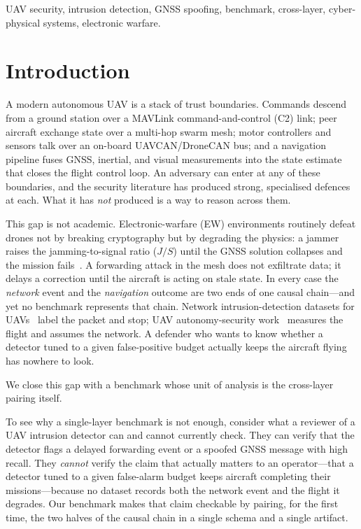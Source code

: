 \documentclass[conference]{IEEEtran}
\begin{document}
\begin{IEEEkeywords}
UAV security, intrusion detection, GNSS spoofing, benchmark, cross-layer,
cyber-physical systems, electronic warfare.
\end{IEEEkeywords}

\section{Introduction}
A modern autonomous UAV is a stack of trust boundaries. Commands descend from a
ground station over a MAVLink command-and-control (C2) link; peer aircraft
exchange state over a multi-hop swarm mesh; motor controllers and sensors talk
over an on-board UAVCAN/DroneCAN bus; and a navigation pipeline fuses GNSS,
inertial, and visual measurements into the state estimate that closes the flight
control loop. An adversary can enter at any of these boundaries, and the
security literature has produced strong, specialised defences at each. What it
has \emph{not} produced is a way to reason across them.

This gap is not academic. Electronic-warfare (EW) environments routinely defeat
drones not by breaking cryptography but by degrading the physics: a jammer
raises the jamming-to-signal ratio ($J/S$) until the GNSS solution collapses and
the mission fails~\cite{kassas2022jammer}. A forwarding attack in the mesh does
not exfiltrate data; it delays a correction until the aircraft is acting on stale
state. In every case the \emph{network} event and the \emph{navigation} outcome
are two ends of one causal chain---and yet no benchmark represents that chain.
Network intrusion-detection datasets for
UAVs~\cite{uavids2025,uavcas2026,hcrl_uavcan} label the packet and stop; UAV
autonomy-security work~\cite{whelan2020novelty,kerns2014capture} measures the
flight and assumes the network. A defender who wants to know whether a detector
tuned to a given false-positive budget actually keeps the aircraft flying has
nowhere to look.

We close this gap with a benchmark whose unit of analysis is the cross-layer
pairing itself.

To see why a single-layer benchmark is not enough, consider what a reviewer of
a UAV intrusion detector can and cannot currently check. They can verify that
the detector flags a delayed forwarding event or a spoofed GNSS message with
high recall. They \emph{cannot} verify the claim that actually matters to an
operator---that a detector tuned to a given false-alarm budget keeps aircraft
completing their missions---because no dataset records both the network event
and the flight it degrades. Our benchmark makes that claim checkable by pairing,
for the first time, the two halves of the causal chain in a single schema and a
single artifact.
\end{document}
